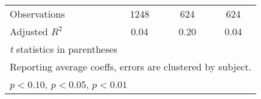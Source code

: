\begin{table}[htbp]
\begin{tabular}{l*{3}{c}}
\hline
Observations    &     1248         &      624         &      624         \\
Adjusted \(R^{2}\)&     0.04         &     0.20         &     0.04         \\
\hline\hline
\multicolumn{4}{l}{\footnotesize \textit{t} statistics in parentheses}\\
\multicolumn{4}{l}{\footnotesize Reporting average coeffs, errors are clustered by subject.}\\
\multicolumn{4}{l}{\footnotesize \sym{*} \(p<0.10\), \sym{**} \(p<0.05\), \sym{***} \(p<0.01\)}\\
\end{tabular}
\end{table}
